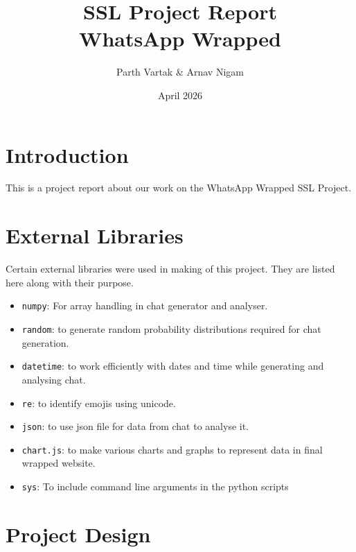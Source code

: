 \documentclass[12pt]{extarticle}
\title{\textbf{SSL Project Report\\ WhatsApp Wrapped}}
\author{Parth Vartak \& Arnav Nigam}
\date{April 2026}
\begin{document}
\maketitle
\tableofcontents
\pagebreak
\section{Introduction}
This is a project report about our work on the WhatsApp Wrapped SSL Project.
\section{External Libraries}
Certain external libraries were used in making of this project. They are listed here along with their purpose.
\begin{itemize}
    \item \texttt{numpy}: For array handling in chat generator and analyser.
    \item \texttt{random}: to generate random probability distributions required for chat generation.
    \item \texttt{datetime}: to work efficiently with dates and time while generating and analysing chat.
    \item \texttt{re}: to identify emojis using unicode.
    \item \texttt{json}: to use json file for data from chat to analyse it.
    \item \texttt{chart.js}: to make various charts and graphs to represent data in final wrapped website.
    \item \texttt{sys}: To include command line arguments in the python scripts
\end{itemize}
\section{Project Design}
\end{document}
